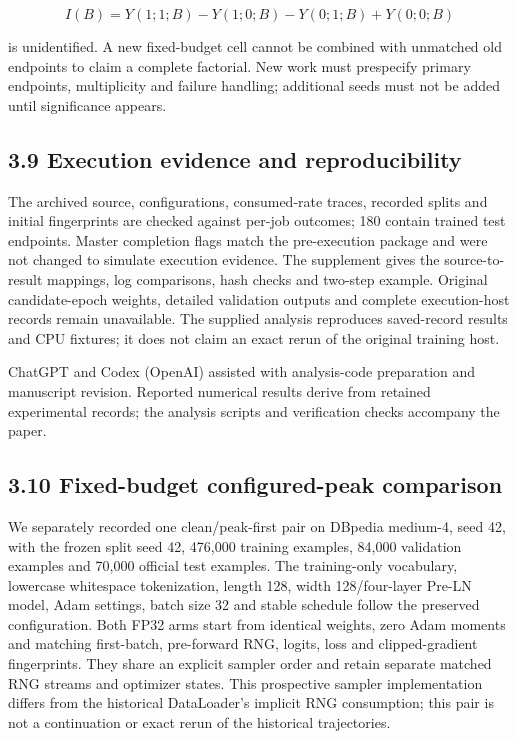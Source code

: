 \documentclass[smallextended]{svjour3}
\begin{document}
\[I(B)=Y(1;1;B)-Y(1;0;B)-Y(0;1;B)+Y(0;0;B)\]

is unidentified. A new fixed-budget cell cannot be combined with unmatched old endpoints to claim a complete factorial. New work must prespecify primary endpoints, multiplicity and failure handling; additional seeds must not be added until significance appears.

\subsection{3.9 Execution evidence and reproducibility}\label{execution-evidence-and-reproducibility}

The archived source, configurations, consumed-rate traces, recorded splits and initial fingerprints are checked against per-job outcomes; 180 contain trained test endpoints. Master completion flags match the pre-execution package and were not changed to simulate execution evidence. The supplement gives the source-to-result mappings, log comparisons, hash checks and two-step example. Original candidate-epoch weights, detailed validation outputs and complete execution-host records remain unavailable. The supplied analysis reproduces saved-record results and CPU fixtures; it does not claim an exact rerun of the original training host.

ChatGPT and Codex (OpenAI) assisted with analysis-code preparation and manuscript revision. Reported numerical results derive from retained experimental records; the analysis scripts and verification checks accompany the paper.

\subsection{3.10 Fixed-budget configured-peak comparison}\label{fixed-budget-configured-peak-comparison}

We separately recorded one clean/peak-first pair on DBpedia medium-4, seed 42, with the frozen split seed 42, 476,000 training examples, 84,000 validation examples and 70,000 official test examples. The training-only vocabulary, lowercase whitespace tokenization, length 128, width 128/four-layer Pre-LN model, Adam settings, batch size 32 and stable schedule follow the preserved configuration. Both FP32 arms start from identical weights, zero Adam moments and matching first-batch, pre-forward RNG, logits, loss and clipped-gradient fingerprints. They share an explicit sampler order and retain separate matched RNG streams and optimizer states. This prospective sampler implementation differs from the historical DataLoader's implicit RNG consumption; this pair is not a continuation or exact rerun of the historical trajectories.
\end{document}
